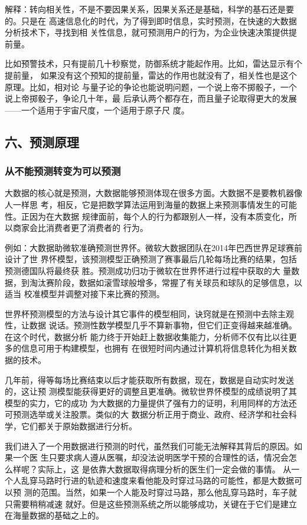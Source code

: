 \documentclass[11pt]{ctexart}
\begin{document}
{{{{解释：转向相关性，不是不要因果关系，因果关系还是基础，科学的基石还是要的。只是在
高速信息化的时代，为了得到即时信息，实时预测，在快速的大数据分析技术下，寻找到相
关性信息，就可预测用户的行为，为企业快速决策提供提前量。

比如预警技术，只有提前几十秒察觉，防御系统才能起作用。比如，雷达显示有个提前量，
如果没有这个预知的提前量，雷达的作用也就没有了，相关性也是这个原理。比如，相对论
与量子论的争论也能说明问题，一个说上帝不掷骰子，一个说上帝掷骰子，争论几十年，最
后承认两个都存在，而且量子论取得更大的发展——一个适用于宇宙尺度，一个适用于原子尺
度。

\subsection{六、预测原理}
\label{sec:org83c7944}

\subsubsection{从不能预测转变为可以预测}
\label{sec:org65d458f}

大数据的核心就是预测，大数据能够预测体现在很多方面。大数据不是要教机器像人一样思
考，相反，它是把数学算法运用到海量的数据上来预测事情发生的可能性。正因为在大数据
规律面前，每个人的行为都跟别人一样，没有本质变化，所以商家会比消费者更了消费者的
行为。

例如：大数据助微软准确预测世界怀。微软大数据团队在2014年巴西世界足球赛前设计了世
界怀模型，该预测模型正确预测了赛事最后几轮每场比赛的结果，包括预测德国队将最终获
胜。预测成功归功于微软在世界怀进行过程中获取的大
量数据，到淘汰赛阶段，数据如滚雪球般增多，常握了有关球员和球队的足够信息，以适当
校准模型并调整对接下来比赛的预测。

世界杯预测模型的方法与设计其它事件的模型相同，诀窍就是在预测中去除主观性，让数据
说话。预测性数学模型几乎不算新事物，但它们正变得越来越准确。在这个时代，数据分析
能力终于开始赶上数据收集能力，分析师不仅有比以往更多的信息可用于构建模型，也拥有
在很短时间内通过计算机将信息转化为相关数据的技术。

几年前，得等每场比赛结束以后才能获取所有数据，现在，数据是自动实时发送的，这让预
测模型能获得更好的调整且更准确。微软世界怀模型的成绩说明了其模型的实力，它的成功
为大数据的力量提供了强有力的证明，利用同样的方法还可预测选举或关注股票。类似的大
数据分析正用于商业、政府、经济学和社会科学，它们都关于原始数据进行分析。

我们进入了一个用数据进行预测的时代，虽然我们可能无法解释其背后的原因。如果一个医
生只要求病人遵从医嘱，却没法说明医学干预的合理性的话，情况会怎么样呢？实际上，这
是依靠大数据取得病理分析的医生们一定会做的事情。
从一个人乱穿马路时行进的轨迹和速度来看他能及时穿过马路的可能性，都是大数据可以预
测的范围。当然，如果一个人能及时穿过马路，那么他乱穿马路时，车子就只需要稍稍减速
就好。但是这些预测系统之所以能够成功，关键在于它们是建立在海量数据的基础之上的。


}}}}
\end{document}
